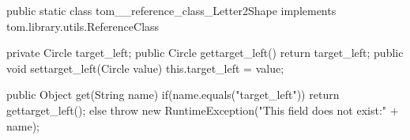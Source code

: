 \begin{tomcode3}[caption=Exemple de classe générée implémentant l'interface \texttt{ReferenceClass} dans le cas de la transformation \emph{Text2Picture}.,label=code:exreferenceClass]
public static class tom__reference_class_Letter2Shape 
                                   implements tom.library.utils.ReferenceClass {
  private Circle target_left;
  public Circle gettarget_left() { return target_left; }
  public void settarget_left(Circle value) { this.target_left = value; }

  public Object get(String name) {
    if(name.equals("target_left")) {
      return gettarget_left();
    } else  {
      throw new RuntimeException("This field does not exist:" + name);
    }
  }
}
\end{tomcode3}
%
%
%
%
